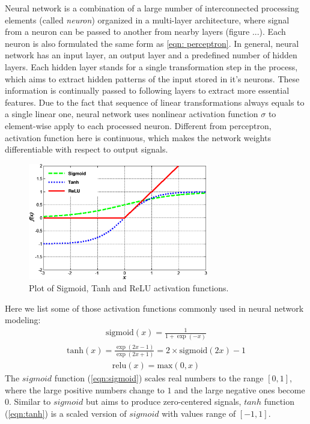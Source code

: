 Neural network is a combination of a large number of interconnected processing elements (called \textit{neuron}) organized in a multi-layer architecture, where signal from a neuron can be passed to another from nearby layers (figure ...).
Each neuron is also formulated the same form as \ref{eqn: perceptron}. 
In general, neural network has an input layer, an output layer and a predefined number of hidden layers. 
Each hidden layer stands for a single transformation step in the process, which aims to extract hidden patterns of the input stored in it's neurons. These information is continually passed to following layers to extract more essential features. 
Due to the fact that sequence of linear transformations always equals to a single linear one, neural network uses nonlinear activation function $\sigma$ to element-wise apply to each processed neuron. 
Different from perceptron, activation function here is continuous, which makes the network weights differentiable with respect to output signals. \\
\begin{figure}[t!]
    \centering
    \includegraphics[width=0.7\textwidth]{images/activation.png}
    \caption{Plot of Sigmoid, Tanh and ReLU activation functions.}
    \label{fig:activation}
\end{figure}
Here we list some of those activation functions commonly used in neural network modeling:
\begin{align} \label{eqn:sigmoid}
    \mathrm{sigmoid}(x) = \frac{1}{1 + \exp(-x)}
\end{align}
\begin{align} \label{eqn:tanh}
    \mathrm{tanh}(x) = \frac{\exp(2x - 1)}{\exp(2x + 1)} = 2 \times \mathrm{sigmoid}(2x) - 1
\end{align}
\begin{align} \label{eqn:relu}
    \mathrm{relu}(x) = \mathrm{max}(0, x)
\end{align}
The $sigmoid$ function (\ref{eqn:sigmoid}) scales real numbers to the range $[0, 1]$, where the large positive numbers change to $1$ and the large negative ones become $0$. Similar to $sigmoid$ but aims to produce zero-centered signals, $tanh$ function (\ref{eqn:tanh}) is a scaled version of $sigmoid$ with values range of $[-1, 1]$.\\

